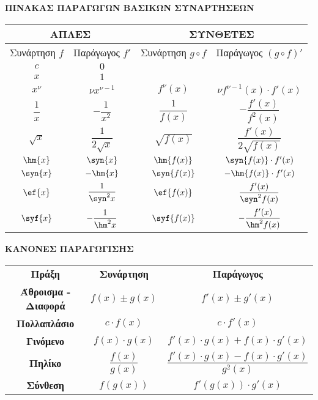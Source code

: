 \documentclass[twoside,nofonts,internet,math,spyros]{frontisthrio}
\begin{document}
\begin{center}
\textbf{ΠΙΝΑΚΑΣ ΠΑΡΑΓΩΓΩΝ ΒΑΣΙΚΩΝ ΣΥΝΑΡΤΗΣΕΩΝ}
\begin{longtable}{cc|cc}
\hline  \multicolumn{2}{c|}{\textbf{ΑΠΛΕΣ}} & \multicolumn{2}{c}{\textbf{ΣΥΝΘΕΤΕΣ}} \rule[-2ex]{0pt}{5.5ex} \\ 
\hline \rule[-2ex]{0pt}{5.5ex} Συνάρτηση $ f $& Παράγωγος $ f' $ & Συνάρτηση $ g\circ f $ & Παράγωγος $ \left( g\circ f \right)' $ \\ 
\hhline{====} \rule[-2ex]{0pt}{5.5ex} $ c $ & $ 0 $ &  &  \\ 
\rule[-2ex]{0pt}{5ex} $ x $ & $ 1 $ &  &  \\ 
\rule[-2ex]{0pt}{5ex} $ x^\nu $ & $ \nu x^{\nu-1} $ & $ f^\nu(x) $ & $ \nu f^{\nu-1}(x)\cdot f'(x) $ \\ 
\rule[-2ex]{0pt}{5ex} $ \dfrac{1}{x} $ & $ -\dfrac{1}{x^2} $ & $ \dfrac{1}{f(x)} $ & $ -\dfrac{f'(x)}{f^2(x)} $ \\ 
\rule[-2ex]{0pt}{7ex} $ \sqrt{x} $ & $ \dfrac{1}{2\!\sqrt{x}} $ & $ \sqrt{f(x)} $ & $ \dfrac{f'(x)}{2\!\sqrt{f(x)}} $ \\ 
\rule[-2ex]{0pt}{5ex} $ \hm{x} $ & $ \syn{x} $ & $ \hm{f(x)} $ & $ \syn{f(x)}\cdot f'(x) $ \\ 
\rule[-2ex]{0pt}{5ex} $ \syn{x} $ & $ -\hm{x} $ & $ \syn{f(x)} $ & $ -\hm{f(x)}\cdot f'(x) $ \\ 
\rule[-2ex]{0pt}{5ex} $ \ef{x} $ & $ \dfrac{1}{\syn^2{x}} $ & $ \ef{f(x)} $ & $ \dfrac{f'(x)}{\syn^2{f(x)}} $ \\ 
\rule[-2ex]{0pt}{7ex} $ \syf{x} $ & $ -\dfrac{1}{\hm^2{x}} $ & $ \syf{f(x)} $ & $ -\dfrac{f'(x)}{\hm^2{f(x)}} $ \\ 
\hline 
\end{longtable}
\end{center}
\begin{center}
\vspace{5mm}
\textbf{ΚΑΝΟΝΕΣ ΠΑΡΑΓΩΓΙΣΗΣ}\\
\vspace{5mm}
\begin{tabular}{ccc}
\hline 
\rule[-2ex]{0pt}{5ex} \textbf{Πράξη} & \textbf{Συνάρτηση} & \textbf{Παράγωγος} \\ 
\hhline{===}
\rule[-2ex]{0pt}{5ex} \textbf{Άθροισμα - Διαφορά} & $ f(x)\pm g(x) $ & $ f'(x)\pm g'(x) $ \\ 
\rule[-2ex]{0pt}{5ex} \textbf{Πολλαπλάσιο} & $ c\cdot f(x) $ & $ c\cdot f'(x) $ \\  
\rule[-2ex]{0pt}{5ex} \textbf{Γινόμενο} & $ f(x)\cdot g(x) $ & $ f'(x)\cdot g(x)+f(x)\cdot g'(x) $ \\ 
\rule[-2ex]{0pt}{5ex} \textbf{Πηλίκο} & $ \dfrac{f(x)}{g(x)} $ & $ \dfrac{f'(x)\cdot g(x)-f(x)\cdot g'(x)}{g^2(x)} $ \\  
\rule[-2ex]{0pt}{5ex} \textbf{Σύνθεση} & $ f(g(x)) $ & $ f'(g(x))\cdot g'(x) $ \\ 
\hline 
\end{tabular}  
\end{center}
\newpage
\end{document}
